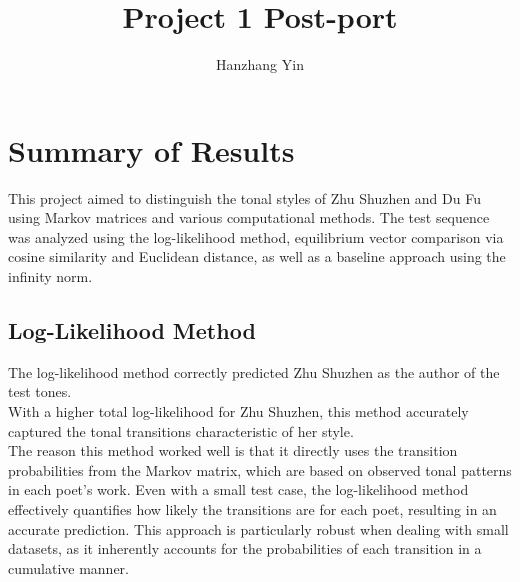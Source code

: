\documentclass[12pt]{article}
\title{\vspace{-2cm}Project 1 Post-port}
\author{Hanzhang Yin}
\begin{document}
\maketitle

\section*{Summary of Results}

This project aimed to distinguish the tonal styles of Zhu Shuzhen and Du Fu using Markov matrices and various computational methods. The test sequence was analyzed using the log-likelihood method, equilibrium vector comparison via cosine similarity and Euclidean distance, as well as a baseline approach using the infinity norm.

\subsection*{Log-Likelihood Method}

The log-likelihood method correctly predicted Zhu Shuzhen as the author of the test tones.
\\
\noindent With a higher total log-likelihood for Zhu Shuzhen, this method accurately captured the tonal transitions characteristic of her style. 
\\
The reason this method worked well is that it directly uses the transition probabilities from the Markov matrix, which are based on observed tonal patterns in each poet's work. Even with a small test case, the log-likelihood method effectively quantifies how likely the transitions are for each poet, resulting in an accurate prediction. 
This approach is particularly robust when dealing with small datasets, as it inherently accounts for the probabilities of each transition in a cumulative manner.
\end{document}
